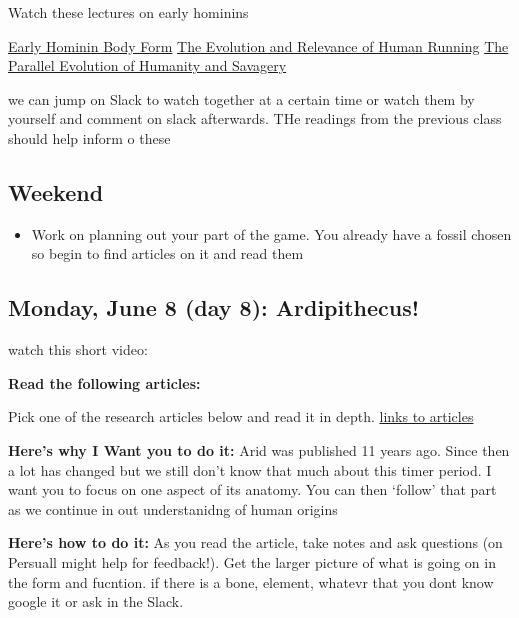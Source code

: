 \documentclass[]{tufte-handout}
\providecommand{\tightlist}{%
  \setlength{\itemsep}{0pt}\setlength{\parskip}{0pt}}
\begin{document}
Watch these lectures on early hominins

\href{https://carta.anthropogeny.org/mediaplayer/play/5367/3264}{Early
Hominin Body Form}
\href{https://carta.anthropogeny.org/mediaplayer/play/5371/3272}{The
Evolution and Relevance of Human Running}
\href{https://carta.anthropogeny.org/mediaplayer/play/20547/7939}{The
Parallel Evolution of Humanity and Savagery}

we can jump on Slack to watch together at a certain time or watch them
by yourself and comment on slack afterwards. THe readings from the
previous class should help inform o these

\hypertarget{weekend-1}{%
\subsection{Weekend}\label{weekend-1}}

\begin{itemize}
\tightlist
\item
  Work on planning out your part of the game. You already have a fossil
  chosen so begin to find articles on it and read them
\end{itemize}

\hypertarget{monday-june-8-day-8-ardipithecus}{%
\subsection{Monday, June 8 (day 8):
Ardipithecus!}\label{monday-june-8-day-8-ardipithecus}}

watch this short video:

\textbf{Read the following articles:}

Pick one of the research articles below and read it in depth.
\href{https://www.sciencemag.org/site/feature/misc/webfeat/ardipithecus/index.xhtml}{links
to articles}

\begin{marginfigure}
\textbf{Here's why I Want you to do it:} Arid was published 11 years
ago. Since then a lot has changed but we still don't know that much
about this timer period. I want you to focus on one aspect of its
anatomy. You can then `follow' that part as we continue in out
understanidng of human origins

\textbf{Here's how to do it:} As you read the article, take notes and
ask questions (on Persuall might help for feedback!). Get the larger
picture of what is going on in the form and fucntion. if there is a
bone, element, whatevr that you dont know google it or ask in the Slack.
\end{marginfigure}
\end{document}
